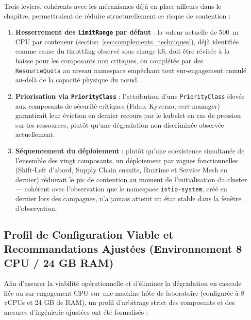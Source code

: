 Trois leviers, cohérents avec les mécanismes déjà en place ailleurs dans le chapitre, permettraient de réduire structurellement ce risque de contention :

\begin{enumerate}
    \item \textbf{Resserrement des \texttt{LimitRange} par défaut} : la valeur actuelle de 500~m CPU par conteneur (section~\ref{sec:complements_techniques}), déjà identifiée comme cause du throttling observé sous charge k6, doit être révisée à la baisse pour les composants non critiques, ou complétée par des \texttt{ResourceQuota} au niveau namespace empêchant tout sur-engagement cumulé au-delà de la capacité physique du nœud.
    \item \textbf{Priorisation via \texttt{PriorityClass}} : l'attribution d'une \texttt{PriorityClass} élevée aux composants de sécurité critiques (Falco, Kyverno, cert-manager) garantirait leur éviction en dernier recours par le kubelet en cas de pression sur les ressources, plutôt qu'une dégradation non discriminée observée actuellement.
    \item \textbf{Séquencement du déploiement} : plutôt qu'une coexistence simultanée de l'ensemble des vingt composants, un déploiement par vagues fonctionnelles (Shift-Left d'abord, Supply Chain ensuite, Runtime et Service Mesh en dernier) réduirait le pic de contention au moment de l'initialisation du cluster — cohérent avec l'observation que le namespace \texttt{istio-system}, créé en dernier lors des campagnes, n'a jamais atteint un état stable dans la fenêtre d'observation.
\end{enumerate}

\subsection{Profil de Configuration Viable et Recommandations Ajustées (Environnement 8 CPU / 24 GB RAM)}
\label{subsec:recommandations_ajustees_machine}

Afin d'assurer la viabilité opérationnelle et d'éliminer la dégradation en cascade liée au sur-engagement CPU sur une machine hôte de laboratoire (configurée à 8 vCPUs et 24 GB de RAM), un profil d'arbitrage strict des composants et des mesures d'ingénierie ajustées ont été formalisés :

